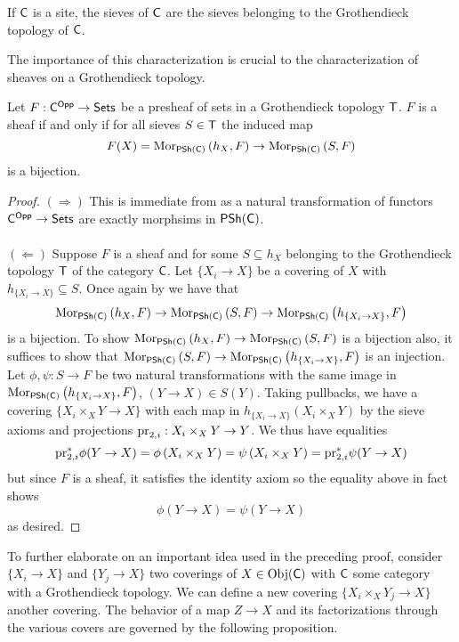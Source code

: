 \begin{remark}
    If $\mathsf{C}$ is a site, the sieves of $\mathsf{C}$ are the sieves belonging to the Grothendieck topology of $\mathsf{C}$. 
\end{remark}
The importance of this characterization is crucial to the characterization of sheaves on a Grothendieck topology. 
\begin{proposition}\label{prop: sheaf in GT iff bijective on sieves}
    Let $F:\mathsf{C}^{\mathsf{Opp}}\to\mathsf{Sets}$ be a presheaf of sets in a Grothendieck topology $\mathsf{T}$. $F$ is a sheaf if and only if for all sieves $S\in\mathsf{T}$ the induced map 
    $$F(X)=\mathrm{Mor}_{\mathsf{PSh}(\mathsf{C})}\left(h_{X},F\right)\to\mathrm{Mor}_{\mathsf{PSh}(\mathsf{C})}\left(S,F\right)$$
    is a bijection.
\end{proposition}
\begin{proof}
    $(\Longrightarrow)$ This is immediate from  as a natural transformation of functors $\mathsf{C}^{\mathsf{Opp}}\to\mathsf{Sets}$ are exactly morphsims in $\mathsf{PSh}(\mathsf{C})$. 
    \\\\
    $(\Longleftarrow)$ Suppose $F$ is a sheaf and for some $S\subseteq h_{X}$ belonging to the Grothendieck topology $\mathsf{T}$ of the category $\mathsf{C}$. Let $\{X_{i}\to X\}$ be a covering of $X$ with $h_{\{X_{i}\to X\}}\subseteq S$. Once again by  we have that 
    $$\mathrm{Mor}_{\mathsf{PSh}(\mathsf{C})}\left(h_{X},F\right)\to\mathrm{Mor}_{\mathsf{PSh}(\mathsf{C})}\left(S,F\right)\to\mathrm{Mor}_{\mathsf{PSh}(\mathsf{C})}\left(h_{\{X_{i}\to X\}},F\right)$$
    is a bijection. To show $\mathrm{Mor}_{\mathsf{PSh}(\mathsf{C})}\left(h_{X},F\right)\to\mathrm{Mor}_{\mathsf{PSh}(\mathsf{C})}\left(S,F\right)$ is a bijection also, it suffices to show that $\mathrm{Mor}_{\mathsf{PSh}(\mathsf{C})}\left(S,F\right)\to\mathrm{Mor}_{\mathsf{PSh}(\mathsf{C})}\left(h_{\{X_{i}\to X\}},F\right)$ is an injection. Let $\phi,\psi:S\to F$ be two natural transformations with the same image in $\mathrm{Mor}_{\mathsf{PSh}(\mathsf{C})}\left(h_{\{X_{i}\to X\}},F\right)$, $(Y\to X)\in S(Y)$. Taking pullbacks, we have a covering $\{X_{i}\times_{X}Y\to X\}$ with each map in $h_{\{X_{i}\to X\}}\left(X_{i}\times_{X}Y\right)$ by the sieve axioms and projections $\mathrm{pr}_{2,i}:X_{i}\times_{X}Y\to Y$. We thus have equalities 
    $$\mathrm{pr}_{2,i}^{*}\phi(Y\to X)=\phi\left(X_{i}\times_{X}Y\right)=\psi\left(X_{i}\times_{X}Y\right)=\mathrm{pr}_{2,i}^{*}\psi(Y\to X)$$
    but since $F$ is a sheaf, it satisfies the identity axiom so the equality above in fact shows $$\phi(Y\to X)=\psi(Y\to X)$$
    as desired. 
\end{proof}
To further elaborate on an important idea used in the preceding proof, consider $\{X_{i}\to X\}$ and $\{Y_{j}\to X\}$ two coverings of $X\in\mathrm{Obj}(\mathsf{C})$ with $\mathsf{C}$ some category with a Grothendieck topology. We can define a new covering $\{X_{i}\times_{X}Y_{j}\to X\}$ another covering. The behavior of a map $Z\to X$ and its factorizations through the various covers are governed by the following proposition. 
